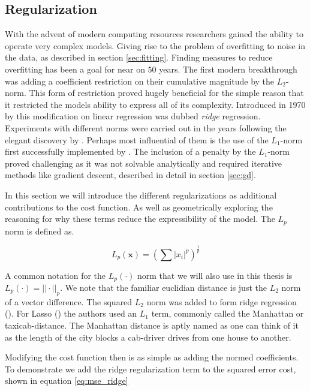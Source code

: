 \subsection{Regularization}\label{sec:regularization}

With the advent of modern computing resources researchers gained the ability to operate very complex models. Giving rise to the problem of overfitting to noise in the data, as described in section \ref{sec:fitting}. Finding measures to reduce overfitting has been a goal for near on $50$ years. The first modern breakthrough was adding a coefficient restriction on their cumulative magnitude by the $L_2$-norm. This form of restriction proved hugely beneficial for the simple reason that it restricted the models ability to express all of its complexity. Introduced in 1970 by \citet{Hoerl1970} this modification on linear regression was dubbed \textit{ridge} regression. Experiments with different norms were carried out in the years following the elegant discovery by \cite{Hoerl1970}. Perhaps most influential of them is the use of the $L_1$-norm first successfully implemented by \citet{Tibshirani1996}. The inclusion of a penalty by the $L_1$-norm proved challenging as it was not solvable analytically and required iterative methods like gradient descent, described in detail in section \ref{sec:gd}. 

In this section we will introduce the different regularizations as additional contributions to the cost function. As well as geometrically exploring the reasoning for why these terms reduce the expressibility of the model. The $L_p$ norm is defined as. 

\begin{equation}
L_p(\mathbf{x}) = \left(\sum |x_i|^p\right)^{\frac{1}{p}}
\end{equation}

\noindent A common notation for the $L_p(\cdot)$ norm that we will also use in this thesis is $L_p(\cdot) = ||\cdot||_p$. We note that the familiar euclidian distance is just the $L_2$ norm of a vector difference. The squared $L_2$ norm was added to form ridge regression (\cite{Hoerl1970}). For Lasso (\cite{Tibshirani1996}) the authors used an $L_1$ term, commonly called the Manhattan or taxicab-distance. The Manhattan distance is aptly named as one can think of it as the length of the city blocks a cab-driver drives from one house to another.

Modifying the cost function then is as simple as adding the normed coefficients. To demonstrate we add the ridge regularization term to the squared error cost, shown in equation \ref{eq:mse_ridge}

